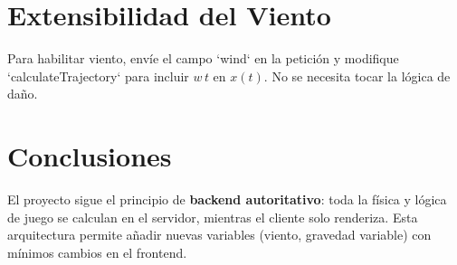 \documentclass[12pt]{article}
\begin{document}
\section{Extensibilidad del Viento}
Para habilitar viento, envíe el campo `wind` en la petición y modifique `calculateTrajectory` para incluir $w\,t$ en $x(t)$. No se necesita tocar la lógica de daño.

\section*{Conclusiones}
El proyecto sigue el principio de \textbf{backend autoritativo}: toda la física y lógica de juego se calculan en el servidor, mientras el cliente solo renderiza. Esta arquitectura permite añadir nuevas variables (viento, gravedad variable) con mínimos cambios en el frontend.
\end{document}

